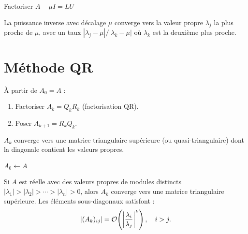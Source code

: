 \begin{algorithm}[H]
\caption{Puissance inverse avec d\'ecalage}\label{alg:puissance-inv}
Factoriser $A-\mu I = LU$\;
\end{algorithm}

\begin{theoreme}
La puissance inverse avec d\'ecalage $\mu$ converge vers la valeur propre $\lambda_j$ la plus proche de $\mu$, avec un taux $|\lambda_j-\mu|/|\lambda_k-\mu|$ o\`u $\lambda_k$ est la deuxi\`eme plus proche.
\end{theoreme}

\section{M\'ethode QR}

\begin{definition}[It\'eration QR]
\`A partir de $A_0=A$ :
\begin{enumerate}
\item Factoriser $A_k=Q_kR_k$ (factorisation QR).
\item Poser $A_{k+1}=R_kQ_k$.
\end{enumerate}
$A_k$ converge vers une matrice triangulaire sup\'erieure (ou quasi-triangulaire) dont la diagonale contient les valeurs propres.
\end{definition}

\begin{algorithm}[H]
\caption{It\'eration QR basique}\label{alg:qr-iter}
$A_0\gets A$\;
\;
\end{algorithm}

\begin{theoreme}
Si $A$ est r\'eelle avec des valeurs propres de modules distincts $|\lambda_1|>|\lambda_2|>\cdots>|\lambda_n|>0$, alors $A_k$ converge vers une matrice triangulaire sup\'erieure. Les \'el\'ements sous-diagonaux satisfont :
\[
|(A_k)_{ij}| = \mathcal{O}\!\left(\left|\frac{\lambda_i}{\lambda_j}\right|^k\right), \quad i>j.
\]
\end{theoreme}

